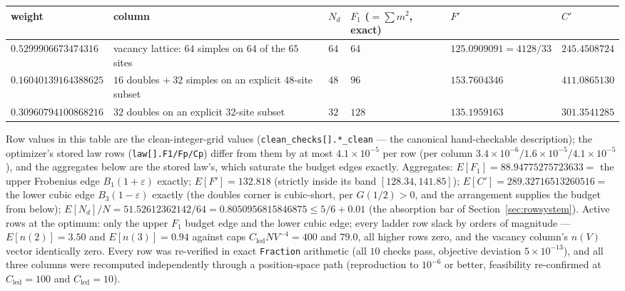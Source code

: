 \documentclass[11pt]{article}
\theoremstyle{plain}
\theoremstyle{definition}
\theoremstyle{remark}
\newcommand{\Cled}{C_{\mathrm{led}}}
\newcommand{\Nd}{N_{d}}
\begin{document}
\begin{table}[h]
\centering
\footnotesize
\begin{tabular}{@{}>{\raggedright\arraybackslash}p{3.1cm}
                  >{\raggedright\arraybackslash}p{3.0cm} l
                  >{\raggedright\arraybackslash}p{1.9cm}
                  >{\raggedright\arraybackslash}p{2.7cm} l@{}}
\toprule
weight & column & $\Nd$ & $F_1$ ($= \sum m^2$, exact) & $F'$ & $C'$ \\
\midrule
$0.5299906673474316$ &
vacancy lattice: $64$ simples on $64$ of the $65$ sites &
$64$ & $64$ & $125.0909091 = 4128/33$ & $245.4508724$ \\
\addlinespace
$0.16040139164388625$ &
$16$ doubles $+\ 32$ simples on an explicit $48$-site subset &
$48$ & $96$ & $153.7604346$ & $411.0865130$ \\
\addlinespace
$0.30960794100868216$ &
$32$ doubles on an explicit $32$-site subset &
$32$ & $128$ & $135.1959163$ & $301.3541285$ \\
\bottomrule
\end{tabular}
\end{table}

Row values in this table are the clean-integer-grid values
(\texttt{clean\_checks[].*\_clean} --- the canonical hand-checkable description);
the optimizer's stored law rows (\texttt{law[].F1/Fp/Cp}) differ from them by at
most $4.1 \times 10^{-5}$ per row (per column
$3.4 \times 10^{-6} / 1.6 \times 10^{-5} / 4.1 \times 10^{-5}$), and the
aggregates below are the stored law's, which saturate the budget edges exactly.
Aggregates: $E[F_1] = 88.94775275723633 = $ the upper Frobenius edge
$B_1(1 + \varepsilon)$ exactly; $E[F'] = 132.818$ (strictly inside its band
$[128.34, 141.85]$); $E[C'] = 289.32716513260516 = $ the lower cubic edge
$B_3(1 - \varepsilon)$ exactly (the doubles corner is cubic-short, per
$G(1/2) > 0$, and the arrangement supplies the budget from below);
$E[\Nd]/N = 51.52612362142/64 = 0.8050956815846875 \le 5/6 + 0.01$ (the
absorption bar of Section~\ref{sec:rowsystem}). Active rows at the optimum: only
the upper $F_1$ budget edge and the lower cubic edge; every ladder row slack by
orders of magnitude --- $E[n(2)] = 3.50$ and $E[n(3)] = 0.94$ against caps
$\Cled N V^{-4} = 400$ and $79.0$, all higher rows zero, and the vacancy column's
$n(V)$ vector identically zero. Every row was re-verified in exact
\texttt{Fraction} arithmetic (all $10$ checks pass, objective deviation
$5 \times 10^{-13}$), and all three columns were recomputed independently
through a position-space path (reproduction to $10^{-6}$ or better, feasibility
re-confirmed at $\Cled = 100$ and $\Cled = 10$).
\end{document}
